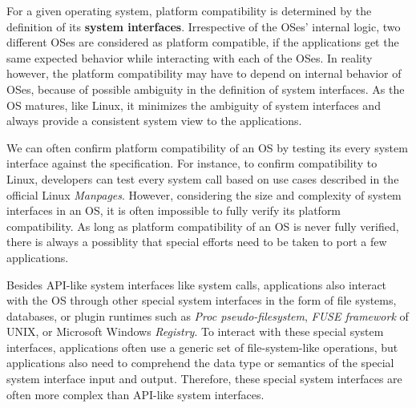For a given 
operating system, platform compatibility 
is determined by the definition of its {\bf system interfaces}.
Irrespective of the OSes' internal logic, two different OSes are considered as platform compatible, if the applications get the same expected behavior while interacting with each of the OSes.
In reality however, the platform compatibility may have to depend on internal behavior of OSes, because of possible ambiguity in the definition of system interfaces.
As the OS matures, like Linux, it minimizes the ambiguity of system interfaces
and always provide a consistent system view to the applications.

We can often confirm platform compatibility of an OS by testing its every system interface against the specification.
For instance, to confirm compatibility to Linux, developers can test every system call based on use cases described in the official Linux {\em Manpages}.
However, considering the size and complexity of system interfaces in an OS, it is often impossible to fully verify its platform compatibility.
As long as platform compatibility of an OS is never fully verified,
there is always a possiblity that special efforts need to be taken to port a few applications.

Besides API-like system interfaces like system calls,
applications also interact with the OS through other special system interfaces in the form of file systems, databases, or plugin runtimes such as {\em Proc pseudo-filesystem}, {\em FUSE framework} of UNIX, or  Microsoft Windows {\em Registry}.
To interact with these special system interfaces, applications often use a generic set of file-system-like operations,
but applications also need to comprehend the data type or semantics of the special system interface input and output. 
Therefore, these special system interfaces are often more complex than API-like system interfaces.

